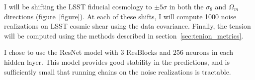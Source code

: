 I will be shifting the LSST fiducial cosmology to $\pm5\sigma$ in both the $\sigma_8$ and $\Omega_m$ directions (figure~\ref{figure}). At each of these shifts, I will compute 1000 noise realizations on LSST cosmic shear using the data covariance. Finally, the tension will be computed using the methods described in section~\ref{sec:tenion_metrics}.

I chose to use the ResNet model with 3 ResBlocks and $256$ neurons in each hidden layer. This model provides good stability in the predictions, and is sufficiently small that running chains on the noise realizations is tractable.









